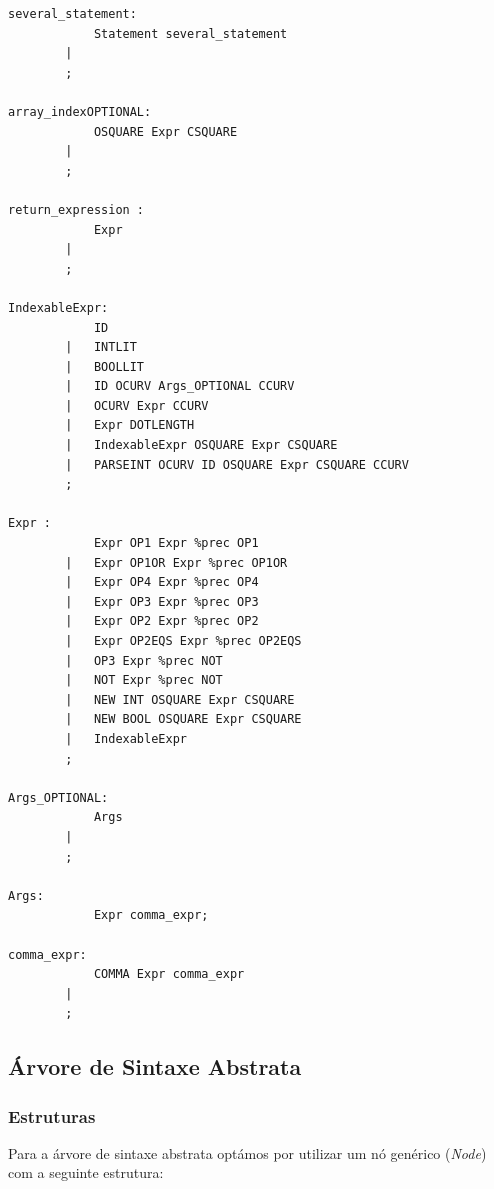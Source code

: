 \documentclass[12pt]{article}
\begin{document}
\begin{lstlisting}
several_statement:
            Statement several_statement     
        |                                       
        ;

array_indexOPTIONAL:
            OSQUARE Expr CSQUARE        
        |                                   
        ;

return_expression : 
            Expr    
        |               
        ;

IndexableExpr: 
            ID                                                  
        |   INTLIT                                              
        |   BOOLLIT                                             
        |   ID OCURV Args_OPTIONAL CCURV                        
        |   OCURV Expr CCURV                                    
        |   Expr DOTLENGTH                                      
        |   IndexableExpr OSQUARE Expr CSQUARE                  
        |   PARSEINT OCURV ID OSQUARE Expr CSQUARE CCURV        
        ;

Expr : 
            Expr OP1 Expr %prec OP1                 
        |   Expr OP1OR Expr %prec OP1OR             
        |   Expr OP4 Expr %prec OP4                 
        |   Expr OP3 Expr %prec OP3                 
        |   Expr OP2 Expr %prec OP2                 
        |   Expr OP2EQS Expr %prec OP2EQS           
        |   OP3 Expr %prec NOT                      
        |   NOT Expr %prec NOT                      
        |   NEW INT OSQUARE Expr CSQUARE            
        |   NEW BOOL OSQUARE Expr CSQUARE           
        |   IndexableExpr                           
        ;

Args_OPTIONAL:
            Args    
        |               
        ;

Args:
            Expr comma_expr;

comma_expr: 
            COMMA Expr comma_expr       
        |                                  
        ;
\end{lstlisting}


\pagebreak
\subsection{Árvore de Sintaxe Abstrata}

\subsubsection{Estruturas}
Para a árvore de sintaxe abstrata optámos por utilizar um nó genérico (\emph{Node}) com a  seguinte estrutura: 
\end{document}
